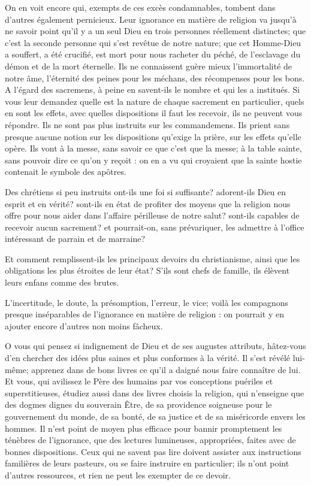 \documentclass[instructions.tex]{subfiles}
\begin{document}
On en voit encore qui, exempts de ces excès condamnables, tombent dans d'autres également pernicieux. Leur ignorance en matière de religion va jusqu'à ne savoir point qu'il y a un seul Dieu en trois personnes réellement distinctes; que c'est la seconde personne qui s'est revêtue de notre nature; que cet Homme-Dieu a souffert, a été crucifié, est mort pour nous racheter du péché, de l'esclavage du démon et de la mort éternelle. Ils ne connaissent guère mieux l'immortalité de notre âme, l'éternité des peines pour les méchans, des récompenses pour les bons. A l'égard des sacremens, à peine en savent-ils le nombre et qui les a institués. Si vous leur demandez quelle est la nature de chaque sacrement en particulier, quels en sont les effets, avec quelles dispositions il faut les recevoir, ils ne peuvent vous répondre. Ils ne sont pas plus instruits sur les commandemens. Ils prient sans presque aucune notion sur les dispositions qu'exige la prière, sur les effets qu'elle opère. Ils vont à la messe, sans savoir ce que c'est que la messe; à la table sainte, sans pouvoir dire ce qu'on y reçoit : on en a vu qui croyaient que la sainte hostie contenait le symbole des apôtres.
 
Des chrétiens si peu instruits ont-ils une foi si suffisante? adorent-ils Dieu en esprit et en vérité? sont-ils en état de profiter des moyens que la religion nous offre pour nous aider dans l'affaire périlleuse de notre salut? sont-ils capables de recevoir aucun sacrement? et pourrait-on, sans prévariquer, les admettre à l'office intéressant de parrain et de marraine?
 
Et comment remplissent-ils les principaux devoirs du christianisme, ainsi que les obligations les plus étroites de leur état? S'ils sont chefs de famille, ils élèvent leurs enfans comme des brutes.
 
L'incertitude, le doute, la présomption, l'erreur, le vice; voilà les compagnons presque inséparables de l'ignorance en matière de religion : on pourrait y en ajouter encore d'autres non moins fâcheux.
 
O vous qui pensez si indignement de Dieu et de ses augustes attributs, hâtez-vous d'en chercher des idées plus saines et plus conformes à la vérité. Il s'est révélé lui-même; apprenez dans de bons livres ce qu'il a daigné nous faire connaître de lui. Et vous, qui avilissez le Père des humains par vos conceptions puériles et superstitieuses, étudiez aussi dans des livres choisis la religion, qui n'enseigne que des dogmes dignes du souverain Être, de sa providence soigneuse pour le gouvernement du monde, de sa bonté, de sa justice et de sa miséricorde envers les hommes. Il n'est point de moyen plus efficace pour bannir promptement les ténèbres de l'ignorance, que des lectures lumineuses, appropriées, faites avec de bonnes dispositions. Ceux qui ne savent pas lire doivent assister aux instructions familières de leurs pasteurs, ou se faire instruire en particulier; ils n'ont point d'autres ressources, et rien ne peut les exempter de ce devoir.
 
\end{document}
